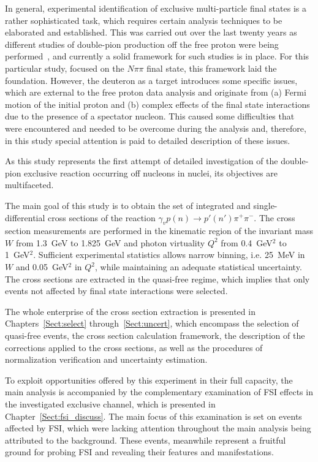 In general, experimental identification of exclusive multi-particle final states is a rather sophisticated task, which requires certain analysis techniques to be elaborated and established. This was carried out over the last twenty years as different studies of double-pion production off the free proton were being performed~\cite{Rip_an_note:2002,Ripani:2002ss,Fed_an_note:2007,Fedotov:2008aa,Isupov:2017lnd,Golovach,Arjun,Fed_an_note:2017,Fed_paper_2018}, and currently a solid framework for such studies is in place. For this particular study, focused on the $N\pi\pi$ final state, this framework laid the foundation. However, the deuteron as a target introduces some specific issues, which are external to the free proton data analysis and originate from (a) Fermi motion of the initial proton and (b) complex effects of the final state interactions due to the presence of a spectator nucleon. This caused some difficulties that were encountered and needed to be overcome during the analysis and, therefore, in this study special attention is paid to detailed description of these issues.

As this study represents the first attempt of detailed investigation of the double-pion exclusive reaction occurring off nucleons in nuclei, its objectives are multifaceted. 



The main goal of this study is to obtain the set of integrated and single-differential cross sections of the reaction $\gamma_{v}p(n) \rightarrow p' (n')\pi^{+}\pi^{-}$. The cross section measurements are performed in the kinematic region of the invariant mass $W$ from 1.3~GeV to 1.825~GeV and photon virtuality $Q^{2}$ from 0.4~GeV$^2$ to 1~GeV$^2$. Sufficient experimental statistics allows narrow binning, i.e. 25~MeV in $W$ and 0.05~GeV$^2$ in $Q^2$, while maintaining an adequate statistical uncertainty. The cross sections are extracted in the quasi-free regime, which implies that only events not affected by final state interactions were selected.


The whole enterprise of the cross section extraction is presented in Chapters~\ref{Sect:select} through~\ref{Sect:uncert}, which encompass the selection of quasi-free events, the cross section calculation framework, the description of the corrections applied to the cross sections, as well as the procedures of normalization verification and uncertainty estimation. 

To exploit opportunities offered by this experiment in their full capacity, the main analysis is accompanied by the complementary examination of FSI effects in the investigated exclusive channel, which is presented in Chapter~\ref{Sect:fsi_discuss}. The main focus of this examination is set on events affected by FSI, which were lacking attention throughout the main analysis being attributed to the background. These events, meanwhile represent a fruitful ground for probing FSI and revealing their features and manifestations.

